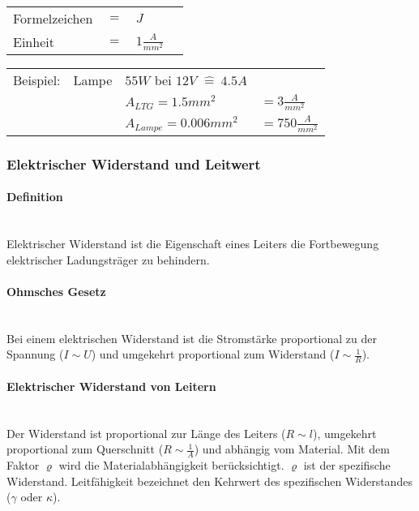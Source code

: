 \begin{tabular}{llll}
Formelzeichen	& $=$ & $J$ &\\
Einheit			& $=$ & $1\frac{A}{mm^2}$ &\\
\end{tabular}\newline

\begin{tabular}{llll}
Beispiel: & Lampe & $55W$ bei $12V$ $\widehat{=}\ 4.5A$ &\\
& & $A_{LTG} = 1.5mm^2$ & $= 3\frac{A}{mm^2}$\\
& & $A_{Lampe} = 0.006mm^2$ & $= 750\frac{A}{mm^2}$\\
\end{tabular}
		
	\subsubsection{Elektrischer Widerstand und Leitwert}
		\paragraph{Definition}~\\

\noindent Elektrischer Widerstand ist die Eigenschaft eines Leiters die Fortbewegung elektrischer Ladungsträger zu behindern.

		\paragraph{Ohmsches Gesetz}~\\
		
\noindent Bei einem elektrischen Widerstand ist die Stromstärke proportional zu der Spannung ($I \sim U$) und umgekehrt proportional zum Widerstand ($I \sim \frac{1}{R}$).

		\paragraph{Elektrischer Widerstand von Leitern}~\\
		
\noindent Der Widerstand ist proportional zur Länge des Leiters ($R \sim l$), umgekehrt proportional zum Querschnitt ($R \sim \frac{1}{A}$) und abhängig vom Material. Mit dem Faktor $\varrho$ wird die Materialabhängigkeit berücksichtigt. $\varrho$ ist der spezifische Widerstand. Leitfähigkeit bezeichnet den Kehrwert des spezifischen Widerstandes ($\gamma$ oder $\kappa$).\\


